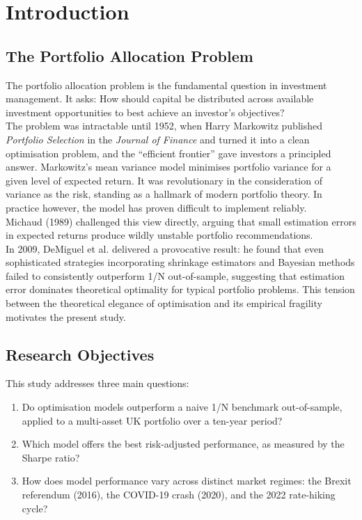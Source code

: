 \documentclass[a4paper,alpha-refs]{scr-contemporary}
\numberwithin{equation}{section}
\begin{document}
\section{Introduction}
\subsection{The Portfolio Allocation Problem}
\indent \indent The portfolio allocation problem is the fundamental question in investment management. 
It asks: How should capital be distributed across available investment opportunities to best achieve 
an investor's objectives? \\
\indent The problem was intractable until 1952, when Harry Markowitz published \textit{Portfolio Selection} in the 
\textit{Journal of Finance} and turned it into a clean optimisation problem, and the “efficient frontier” 
gave investors a principled answer. Markowitz's mean variance model minimises portfolio variance for a given 
level of expected return. It was revolutionary in the consideration of variance as the risk, standing as a 
hallmark of modern portfolio theory. In practice however, the model has proven difficult to implement reliably. \\
\indent Michaud (1989) challenged this view directly, arguing that small estimation errors in expected 
returns produce wildly unstable portfolio recommendations. \\
\indent In 2009, DeMiguel et al. delivered a provocative result: he found that even sophisticated strategies 
incorporating shrinkage estimators and Bayesian methods failed to consistently outperform 1/N out-of-sample, 
suggesting that estimation error dominates theoretical optimality for typical portfolio problems. This tension 
between the theoretical elegance of optimisation and its empirical fragility motivates the present study. 


\subsection{Research Objectives}
\indent \indent This study addresses three main questions:
\begin{enumerate}
    \item Do optimisation models outperform a naive 1/N benchmark
    out-of-sample, applied to a multi-asset UK portfolio over 
    a ten-year period? 
    \item Which model offers the best risk-adjusted performance, 
    as measured by the Sharpe ratio?
    \item How does model performance vary across distinct market
    regimes: the Brexit referendum (2016), the COVID-19 crash (2020),
    and the 2022 rate-hiking cycle?
\end{enumerate}
\end{document}

